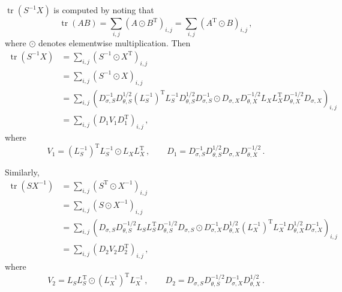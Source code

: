 \documentclass[12pt]{article}
\DeclareMathOperator{\tr}{tr}
\newcommand{\transpose}[1]{#1^{\mathrm{T}}}
\begin{document}
$\tr(S^{-1} X)$ is computed by noting that
\begin{equation}
\tr(A B) = \sum_{i,j} (A \odot \transpose{B})_{i,j} = \sum_{i,j} (\transpose{A} \odot B)_{i,j}\,,
\end{equation}
where $\odot$ denotes elementwise multiplication.
Then
\small
\begin{equation}
\begin{aligned}
\tr(S^{-1} X)
  &= \sum_{i,j} (S^{-1} \odot \transpose{X})_{i,j} \\
  &= \sum_{i,j} (S^{-1} \odot X)_{i,j} \\
  &= \sum_{i,j} (D_{\sigma,S}^{-1} D_{\theta,S}^{1/2} \transpose{(L_{S}^{-1})} L_{S}^{-1} D_{\theta,S}^{1/2} D_{\sigma,S}^{-1} \odot D_{\sigma,X} D_{\theta,X}^{-1/2} L_{X} \transpose{L_{X}} D_{\theta,X}^{-1/2} D_{\sigma,X})_{i,j} \\
  &= \sum_{i,j} (D_{1} V_{1} \transpose{D_{1}})_{i,j}\,,
\end{aligned}
\end{equation}
\normalsize
where
\begin{equation}
V_{1} = \transpose{(L_{S}^{-1})} L_{S}^{-1} \odot L_{X} \transpose{L_{X}}\,,\qquad D_{1} = D_{\sigma,S}^{-1} D_{\theta,S}^{1/2} D_{\sigma,X} D_{\theta,X}^{-1/2}\,.
\end{equation}

Similarly,
\begin{equation}
\begin{aligned}
\tr(S X^{-1})
  &= \sum_{i,j} (\transpose{S} \odot X^{-1})_{i,j} \\
  &= \sum_{i,j} (S \odot X^{-1})_{i,j} \\
  &= \sum_{i,j} (D_{\sigma,S} D_{\theta,S}^{-1/2} L_{S} \transpose{L_{S}} D_{\theta,S}^{-1/2} D_{\sigma,S} \odot D_{\sigma,X}^{-1} D_{\theta,X}^{1/2} \transpose{(L_{X}^{-1})} L_{X}^{-1} D_{\theta,X}^{1/2} D_{\sigma,X}^{-1})_{i,j} \\
  &= \sum_{i,j} (D_{2} V_{2} \transpose{D_{2}})_{i,j}\,,
\end{aligned}
\end{equation}
where
\begin{equation}
V_{2} = L_{S} \transpose{L_{S}} \odot \transpose{(L_{X}^{-1})} L_{X}^{-1}\,,\qquad D_{2} = D_{\sigma,S} D_{\theta,S}^{-1/2} D_{\sigma,X}^{-1} D_{\theta,X}^{1/2}\,.
\end{equation}
\end{document}
